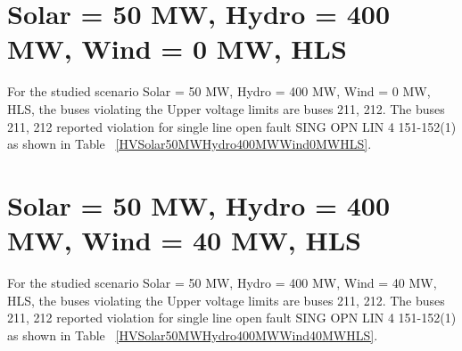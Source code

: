 \documentclass[10pt]{report}
\begin{document}
\section{Solar = 50 MW, Hydro = 400 MW, Wind = 0 MW, HLS}
For the studied scenario Solar = 50 MW, Hydro = 400 MW, Wind = 0 MW, HLS, the buses violating the Upper voltage limits are buses 211, 212.
The buses 211, 212 reported violation for single line open fault SING OPN LIN   4 151-152(1) as shown in Table ~\ref{HVSolar50MWHydro400MWWind0MWHLS}.
\begin{table}[H]
\caption{Contingencies reporting bus voltages greater than emergency voltage of 1.1 PU for scenario Solar = 50 MW, Hydro = 400 MW, Wind = 0 MW, HLS}
\label{HVSolar50MWHydro400MWWind0MWHLS}
\centering
{}
\end{table}


\section{Solar = 50 MW, Hydro = 400 MW, Wind = 40 MW, HLS}
For the studied scenario Solar = 50 MW, Hydro = 400 MW, Wind = 40 MW, HLS, the buses violating the Upper voltage limits are buses 211, 212.
The buses 211, 212 reported violation for single line open fault SING OPN LIN   4 151-152(1) as shown in Table ~\ref{HVSolar50MWHydro400MWWind40MWHLS}.
\begin{table}[H]
\caption{Contingencies reporting bus voltages greater than emergency voltage of 1.1 PU for scenario Solar = 50 MW, Hydro = 400 MW, Wind = 40 MW, HLS}
\label{HVSolar50MWHydro400MWWind40MWHLS}
\centering
{}
\end{table}
\end{document}
